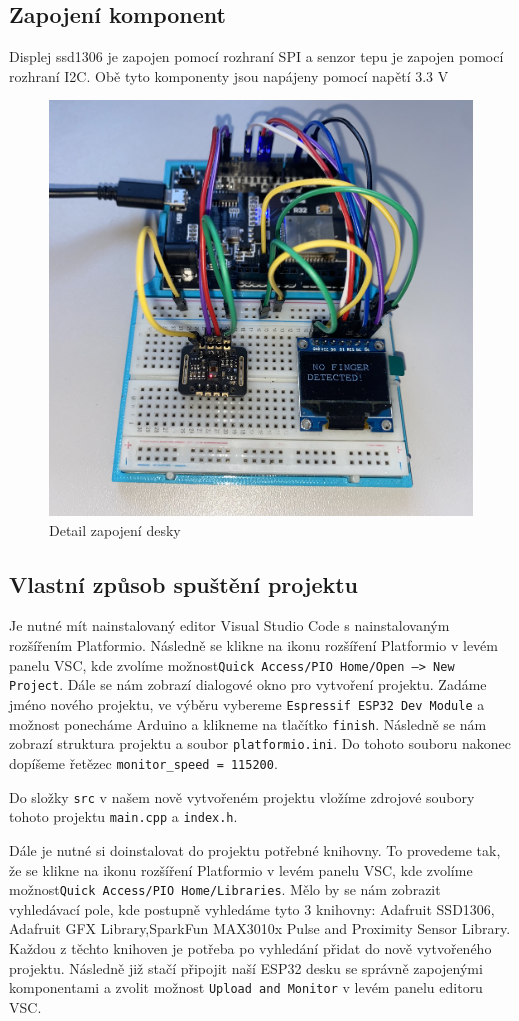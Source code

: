 \documentclass[12pt, a4paper]{article}
\begin{document}
    \subsection{Zapojení komponent}
    Displej ssd1306 je zapojen pomocí rozhraní SPI a senzor tepu je zapojen pomocí rozhraní I2C. Obě tyto komponenty jsou napájeny pomocí napětí 3.3 V
    \begin{figure}[ht]
		\centering
		\includegraphics[width=0.6\linewidth]{images/zapojeni.jpeg}\newline
	    \caption{Detail zapojení desky}
	\end{figure}
    \subsection{Vlastní způsob spuštění projektu}
    Je nutné mít nainstalovaný editor Visual Studio Code s nainstalovaným rozšířením Platformio. Následně se klikne na ikonu rozšíření Platformio v levém panelu VSC, kde zvolíme možnost\newline \texttt{Quick Access/PIO Home/Open --> New Project}. Dále se nám zobrazí dialogové okno pro vytvoření projektu. Zadáme jméno nového projektu, ve výběru  vybereme \texttt{Espressif ESP32 Dev Module} a možnost  ponecháme Arduino a klikneme na tlačítko \texttt{finish}. Následně se nám zobrazí struktura projektu a soubor \texttt{platformio.ini}. Do tohoto souboru nakonec dopíšeme řetězec \texttt{monitor\_speed = 115200}.
    
    Do složky \texttt{src} v našem nově vytvořeném projektu vložíme zdrojové soubory tohoto projektu \texttt{main.cpp} a \texttt{index.h}.
    
    Dále je nutné si doinstalovat do projektu potřebné knihovny. To provedeme tak, že se klikne na ikonu rozšíření Platformio v levém panelu VSC, kde zvolíme možnost\newline \texttt{Quick Access/PIO Home/Libraries}. Mělo by se nám zobrazit vyhledávací pole, kde postupně vyhledáme tyto 3 knihovny: 
    Adafruit SSD1306, Adafruit GFX Library,\newline SparkFun MAX3010x Pulse and Proximity Sensor Library. Každou z těchto knihoven je potřeba po vyhledání přidat do nově vytvořeného projektu. Následně již stačí připojit naší ESP32 desku se správně zapojenými komponentami a zvolit možnost \texttt{Upload and Monitor} v levém panelu editoru VSC.
\end{document}
